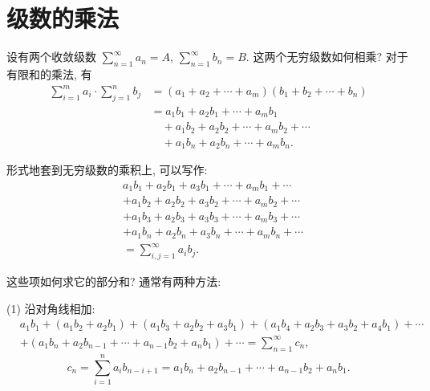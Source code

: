 \section{级数的乘法}\label{sec:12.4}

设有两个收敛级数 $\sum_{n=1}^{\infty}a_{n}=A$, $\sum_{n=1}^{\infty}b_{n}=B$. 这两个无穷级数如何相乘? 对于有限和的乘法, 有
\[
  \begin{aligned}
    \sum_{i=1}^{m}a_{i}\cdot\sum_{j=1}^{n}b_{j}&=(a_{1}+a_{2}+\cdots+a_{m})(b_{1}+b_{2}+\cdots+b_{n})\\
    &=a_{1}b_{1}+a_{2}b_{1}+\cdots+a_{m}b_{1}\\
    &\quad+a_{1}b_{2}+a_{2}b_{2}+\cdots+a_{m}b_{2}+\cdots\\
    &\quad+a_{1}b_{n}+a_{2}b_{n}+\cdots+a_{m}b_{n}.
  \end{aligned}
\]

形式地套到无穷级数的乘积上, 可以写作:
\[
  \begin{aligned}
    &a_{1}b_{1}+a_{2}b_{1}+a_{3}b_{1}+\cdots+a_{m}b_{1}+\cdots\\
    &+a_{1}b_{2}+a_{2}b_{2}+a_{3}b_{2}+\cdots+a_{m}b_{2}+\cdots\\
    &+a_{1}b_{3}+a_{2}b_{3}+a_{3}b_{3}+\cdots+a_{m}b_{3}+\cdots\\
    &+a_{1}b_{n}+a_{2}b_{n}+a_{3}b_{n}+\cdots+a_{m}b_{n}+\cdots\\
    &=\sum_{i,j=1}^{\infty}a_{i}b_{j}.
  \end{aligned}
\]

这些项如何求它的部分和? 通常有两种方法:

(1) 沿对角线相加:
\[
  \begin{aligned}
    &a_{1}b_{1}+(a_{1}b_{2}+a_{2}b_{1})+(a_{1}b_{3}+a_{2}b_{2}+a_{3}b_{1})+(a_{1}b_{4}+a_{2}b_{3}+a_{3}b_{2}+a_{4}b_{1})+\cdots\\
    &+(a_{1}b_{n}+a_{2}b_{n-1}+\cdots+a_{n-1}b_{2}+a_{n}b_{1})+\cdots=\sum_{n=1}^{\infty}c_{n},
  \end{aligned}
\]
\[
  c_{n}=\sum_{i=1}^{n}a_{i}b_{n-i+1}=a_{1}b_{n}+a_{2}b_{n-1}+\cdots+a_{n-1}b_{2}+a_{n}b_{1}.
\]


